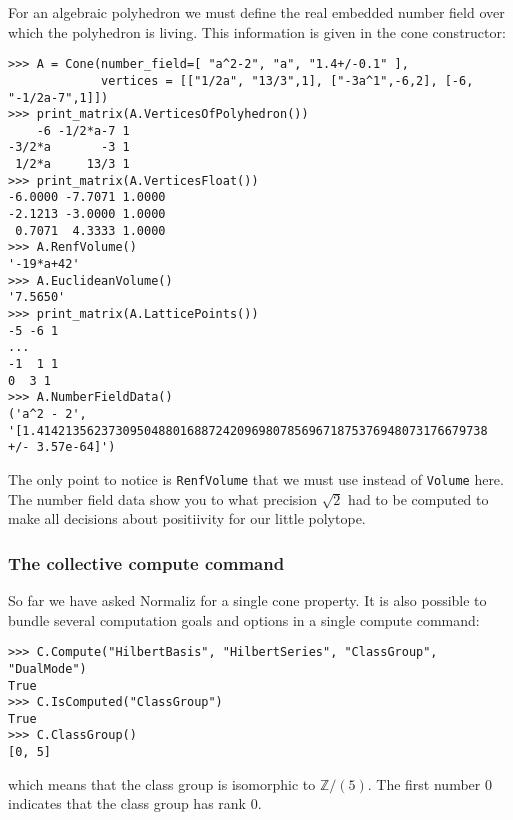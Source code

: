 \documentclass[12pt,a4paper]{scrartcl}
\theoremstyle{definition}
\def\ZZ{{\mathbb Z}}
\begin{document}
\begin{small}
For an algebraic polyhedron we must define the real embedded number field over which the polyhedron is living. This information is given in the cone constructor:
\begin{Verbatim}
>>> A = Cone(number_field=[ "a^2-2", "a", "1.4+/-0.1" ], 
             vertices = [["1/2a", "13/3",1], ["-3a^1",-6,2], [-6, "-1/2a-7",1]])
>>> print_matrix(A.VerticesOfPolyhedron())
    -6 -1/2*a-7 1
-3/2*a       -3 1
 1/2*a     13/3 1
>>> print_matrix(A.VerticesFloat())
-6.0000 -7.7071 1.0000
-2.1213 -3.0000 1.0000
 0.7071  4.3333 1.0000
>>> A.RenfVolume()
'-19*a+42'
>>> A.EuclideanVolume()
'7.5650'
>>> print_matrix(A.LatticePoints())
-5 -6 1
...
-1  1 1
0  3 1
>>> A.NumberFieldData()
('a^2 - 2', '[1.414213562373095048801688724209698078569671875376948073176679738 +/- 3.57e-64]')
\end{Verbatim}

The only point to notice is \verb|RenfVolume| that we must use instead of \verb|Volume| here. The number field data show you to what precision $\sqrt2$ had to be computed to make all decisions about positiivity for our little polytope.

\subsubsection{The collective compute command}
So far we have asked Normaliz for a single cone property. It is also possible to bundle several computation goals and options in a single compute command:
\begin{Verbatim}
>>> C.Compute("HilbertBasis", "HilbertSeries", "ClassGroup", "DualMode")
True
>>> C.IsComputed("ClassGroup")
True
>>> C.ClassGroup()
[0, 5]
\end{Verbatim}
which means that the class group is isomorphic to $\ZZ/(5)$. The first number $0$ indicates that the class group has rank $0$.


\end{small}
\end{document}
